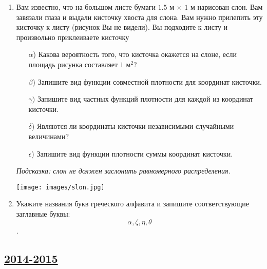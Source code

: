 \begin{enumerate}
\item
Вам известно, что на большом листе бумаги $1.5$ м $\times$ $1$ м нарисован слон. Вам завязали
глаза и выдали кисточку хвоста для слона. Вам нужно прилепить эту кисточку к
листу (рисунок Вы не видели). Вы подходите к листу и произвольно приклеиваете
кисточку
\begin{enumerate}
    \item[$\alpha$)] Какова вероятность того, что кисточка окажется на слоне,
    если площадь рисунка составляет $1$ м$^2$?
    \item[$\beta$)] Запишите вид функции совместной плотности для координат кисточки.
    \item[$\gamma)$] Запишите вид частных функций плотности для каждой из координат кисточки.
    \item[$\delta$)] Являются ли координаты кисточки независимыми случайными величинами?
    \item[$\epsilon$)] Запишите вид функции плотности суммы координат кисточки.
\end{enumerate}
\textit{Подсказка: слон не должен заслонить равномерного распределения.}

\begin{center}
\texttt{[image: images/slon.jpg]}
\end{center}

\item
Укажите названия букв греческого алфавита и запишите соответствующие заглавные буквы:
\[\alpha, \zeta, \eta, \theta\].

\end{enumerate}



\newpage
\subsection[2014-2015]{\hyperref[sec:sol_kr_01_2014_2015]{2014-2015}}
\label{sec:kr_01_2014_2015}

